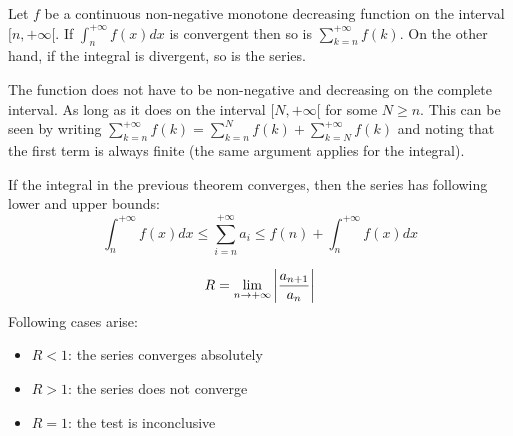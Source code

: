 	\begin{method}
		Let $f$ be a continuous non-negative monotone decreasing function on the interval $[n,+\infty[$. If $\int_n^{+\infty}f(x)dx$ is convergent then so is $\sum_{k=n}^{+\infty}f(k)$. On the other hand, if the integral is divergent, so is the series.
	\end{method}
    	\begin{remark}
    		The function does not have to be non-negative and decreasing on the complete interval. As long as it does on the interval $[N,+\infty[$ for some $N\geq n$. This can be seen by writing $\sum_{k=n}^{+\infty}f(k) = \sum_{k=n}^Nf(k) + \sum_{k=N}^{+\infty}f(k)$ and noting that the first term is always finite (the same argument applies for the integral).
    	\end{remark}
    
	\begin{property}
		If the integral in the previous theorem converges, then the series has following lower and upper bounds:
	        \begin{equation}
			\int_n^{+\infty}f(x)dx \leq \sum_{i=n}^{+\infty}a_i \leq f(n) + \int_n^{+\infty}f(x)dx
		\end{equation}
	\end{property}

	\begin{method}
		\begin{equation}
			R = \lim_{n\rightarrow+\infty}\left|\stylefrac{a_{n+1}}{a_n}\right|
		\end{equation}
		Following cases arise:
	        \begin{itemize}
			\item $R < 1$: the series converges absolutely
		        \item $R > 1$: the series does not converge
		        \item $R = 1$: the test is inconclusive
		\end{itemize}
	\end{method}

